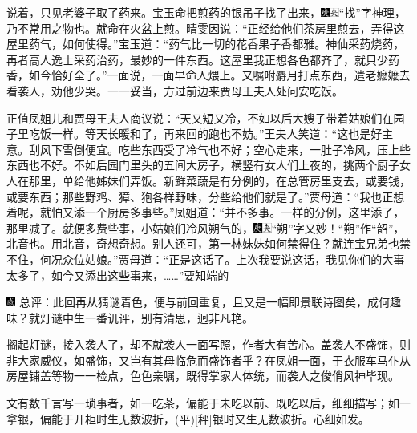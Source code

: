 说着，只见老婆子取了药来。宝玉命把煎药的银吊子找了出来，{\includegraphics[width=3mm]{../Images/00004}\includegraphics[width=3mm]{../Images/00012}\footnotesize \kaishu “找”字神理，乃不常用之物也。}就命在火盆上煎。晴雯因说：“正经给他们茶房里煎去，弄得这屋里药气，如何使得。”宝玉道：“药气比一切的花香果子香都雅。神仙采药烧药，再者高人逸士采药治药，最妙的一件东西。这屋里我正想各色都齐了，就只少药香，如今恰好全了。”一面说，一面早命人煨上。又嘱咐麝月打点东西，遣老嬷嬷去看袭人，劝他少哭。一一妥当，方过前边来贾母王夫人处问安吃饭。

正值凤姐儿和贾母王夫人商议说：“天又短又冷，不如以后大嫂子带着姑娘们在园子里吃饭一样。等天长暖和了，再来回的跑也不妨。”王夫人笑道：“这也是好主意。刮风下雪倒便宜。吃些东西受了冷气也不好；空心走来，一肚子冷风，压上些东西也不好。不如后园门里头的五间大房子，横竖有女人们上夜的，挑两个厨子女人在那里，单给他姊妹们弄饭。新鲜菜蔬是有分例的，在总管房里支去，或要钱，或要东西；那些野鸡、獐、狍各样野味，分些给他们就是了。”贾母道：“我也正想着呢，就怕又添一个厨房多事些。”凤姐道：“并不多事。一样的分例，这里添了，那里减了。就便多费些事，小姑娘们冷风朔气的，{\includegraphics[width=3mm]{../Images/00004}\includegraphics[width=3mm]{../Images/00012}\footnotesize \kaishu “朔”字又妙！“朔”作“韶”，北音也。用北音，奇想奇想。}别人还可，第一林妹妹如何禁得住？就连宝兄弟也禁不住，何况众位姑娘。”贾母道：“正是这话了。上次我要说这话，我见你们的大事太多了，如今又添出这些事来，\ldots{}\ldots{}”要知端的------

{\includegraphics[width=3mm]{../Images/00005}  \kaishu 总评：此回再从猜谜着色，便与前回重复，且又是一幅即景联诗图矣，成何趣味？就灯谜中生一番讥评，别有清思，迥非凡艳。}

{搁起灯谜，接入袭人了，却不就袭人一面写照，作者大有苦心。盖袭人不盛饰，则非大家威仪，如盛饰，又岂有其母临危而盛饰者乎？在凤姐一面，于衣服车马仆从房屋铺盖等物一一检点，色色亲嘱，既得掌家人体统，而袭人之俊俏风神毕现。}

{文有数千言写一琐事者，如一吃茶，偏能于未吃以前、既吃以后，细细描写；如一拿银，偏能于开柜时生无数波折，{{(平)}}{[}秤{]}银时又生无数波折。心细如发。}
